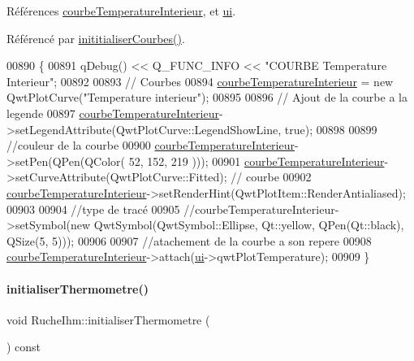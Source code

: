 Références \hyperlink{class_ruche_ihm_a6ce372c8df13bb78c09705432dcfcf58}{courbe\+Temperature\+Interieur}, et \hyperlink{class_ruche_ihm_a64786058bd7f88ca2f1e9743bb27c25b}{ui}.



Référencé par \hyperlink{class_ruche_ihm_a4fe15b22538611ad9ffc4d807f8b78fd}{inititialiser\+Courbes()}.


\begin{DoxyCode}
00890 \{
00891     qDebug() << Q\_FUNC\_INFO << \textcolor{stringliteral}{"COURBE Temperature Interieur"};
00892 
00893     \textcolor{comment}{// Courbes}
00894     \hyperlink{class_ruche_ihm_a6ce372c8df13bb78c09705432dcfcf58}{courbeTemperatureInterieur} = \textcolor{keyword}{new} QwtPlotCurve(\textcolor{stringliteral}{"Temperature interieur"});
00895 
00896      \textcolor{comment}{// Ajout de la courbe a la legende}
00897     \hyperlink{class_ruche_ihm_a6ce372c8df13bb78c09705432dcfcf58}{courbeTemperatureInterieur}->setLegendAttribute(QwtPlotCurve::LegendShowLine, \textcolor{keyword}{
      true});
00898 
00899     \textcolor{comment}{//couleur de la courbe}
00900     \hyperlink{class_ruche_ihm_a6ce372c8df13bb78c09705432dcfcf58}{courbeTemperatureInterieur}->setPen(QPen(QColor( 52, 152, 219 )));
00901     \hyperlink{class_ruche_ihm_a6ce372c8df13bb78c09705432dcfcf58}{courbeTemperatureInterieur}->setCurveAttribute(QwtPlotCurve::Fitted); \textcolor{comment}{//
       courbe}
00902     \hyperlink{class_ruche_ihm_a6ce372c8df13bb78c09705432dcfcf58}{courbeTemperatureInterieur}->setRenderHint(QwtPlotItem::RenderAntialiased);
00903 
00904     \textcolor{comment}{//type de tracé}
00905     \textcolor{comment}{//courbeTemperatureInterieur->setSymbol(new QwtSymbol(QwtSymbol::Ellipse, Qt::yellow, QPen(Qt::black),
       QSize(5, 5)));}
00906 
00907     \textcolor{comment}{//atachement de la courbe a son repere}
00908     \hyperlink{class_ruche_ihm_a6ce372c8df13bb78c09705432dcfcf58}{courbeTemperatureInterieur}->attach(\hyperlink{class_ruche_ihm_a64786058bd7f88ca2f1e9743bb27c25b}{ui}->qwtPlotTemperature);
00909 \}
\end{DoxyCode}
\mbox{\label{class_ruche_ihm_afb64cca9f0e46c25487ef059a4826d49}} 
\paragraph{\texorpdfstring{initialiser\+Thermometre()}{initialiserThermometre()}}
{\footnotesize\ttfamily void Ruche\+Ihm\+::initialiser\+Thermometre (\begin{DoxyParamCaption}{ }\end{DoxyParamCaption}) const\hspace{0.3cm}{\ttfamily [private]}}




